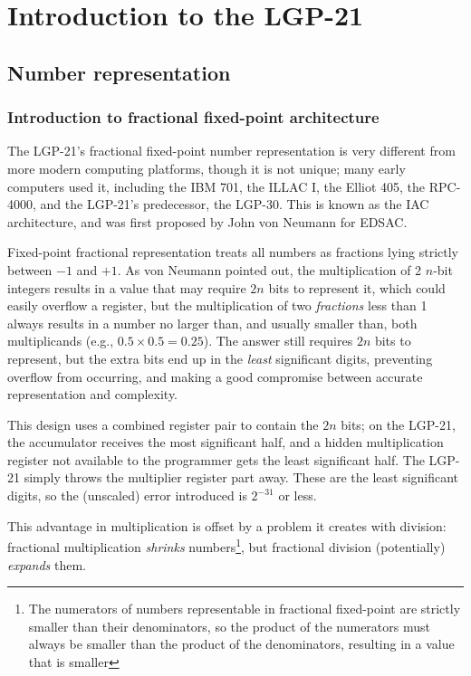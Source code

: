 \section{Introduction to the LGP-21}
\subsection{Number representation}
\subsubsection*{Introduction to fractional fixed-point architecture}
The LGP-21's fractional fixed-point number representation is very different from more modern computing platforms, though it is not unique; many early computers used it, including the IBM 701\cite{ibm701manual}, the ILLAC I\cite{illiac1954}, the Elliot 405\cite{elliott405}, the RPC-4000\cite{rpc4000manual}, and the LGP-21's predecessor, the LGP-30\cite{lgp30programmingmanual}. This is known as the IAC architecture, and was first proposed by John von Neumann for EDSAC\cite{vonneumann1945first}.

Fixed-point fractional representation treats all numbers as fractions lying strictly between $-1$ and $+1$. As von Neumann pointed out\cite{burks1946preliminary}, the multiplication of 2 $n$-bit integers results in a value that may require $2n$ bits to represent it, which could easily overflow a register, but the multiplication of two \emph{fractions} less than 1 always results in a number no larger than, and usually smaller than, both multiplicands (e.g., $0.5 \times 0.5 = 0.25$). The answer still requires $2n$ bits to represent, but the extra bits end up in the \emph{least} significant digits, preventing overflow from occurring, and making a good compromise between accurate representation and complexity.

This design uses a combined register pair to contain the $2n$ bits; on the LGP-21, the accumulator receives the most significant half, and a hidden multiplication register not available to the programmer gets the least significant half. The LGP-21 simply throws the multiplier register part away. These are the least significant digits, so the (unscaled) error introduced is $2^{-31}$ or less.

This advantage in multiplication is offset by a problem it creates with division: fractional multiplication \emph{shrinks} numbers\footnote{The numerators of numbers representable in fractional fixed-point are strictly smaller than their denominators, so the product of the numerators must always be smaller than the product of the denominators, resulting in a value that is smaller}, but fractional division (potentially) \emph{expands} them.

